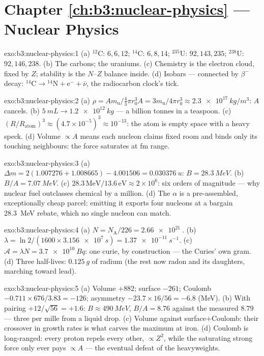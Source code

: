 \section*{Chapter \ref{ch:b3:nuclear-physics} --- Nuclear Physics}

\begin{solution}{exo:b3:nuclear-physics:1}
(a) $^{12}$C: $6, 6, 12$; $^{14}$C: $6, 8, 14$; $^{235}$U:
$92, 143, 235$; $^{238}$U: $92, 146, 238$. (b) The carbons; the
uraniums. (c) Chemistry is the electron cloud, fixed by $Z$;
stability is the $N$--$Z$ balance inside. (d) Isobars ---
connected by $\beta^-$ decay: $^{14}\text{C} \to {}^{14}\text{N}
+ \text{e}^- + \bar\nu$, the radiocarbon clock's tick.
\end{solution}

\begin{solution}{exo:b3:nuclear-physics:2}
(a) $\rho = Am_{\text{u}}/\tfrac43\pi r_0^3A =
3m_{\text{u}}/4\pi r_0^3 \approx \qty{2.3e17}{kg/m^3}$: $A$
cancels. (b) $\qty{5}{mL} \to \qty{1.2e12}{kg}$ --- a billion
tonnes in a teaspoon. (c) $(R/R_{\text{atom}})^3 \approx
(4.7\times10^{-5})^3 \approx 10^{-13}$: the atom is empty space
with a heavy speck. (d) Volume $\propto A$ means each nucleon
claims fixed room and binds only its touching neighbours: the
force saturates at \unit{fm} range.
\end{solution}

\begin{solution}{exo:b3:nuclear-physics:3}
(a) $\Delta m = 2(1.007276 + 1.008665) - 4.001506 =
\qty{0.030376}{u}$: $B = \qty{28.3}{MeV}$. (b) $B/A =
\qty{7.07}{MeV}$. (c) $28.3\,\text{MeV}/13.6\,\text{eV} \approx
2\times10^6$: six orders of magnitude --- why nuclear fuel
outclasses chemical by a million. (d) The $\alpha$ is a
pre-assembled, exceptionally cheap parcel: emitting it exports
four nucleons at a bargain \qty{28.3}{MeV} rebate, which no
single nucleon can match.
\end{solution}

\begin{solution}{exo:b3:nuclear-physics:4}
(a) $N = N_{\text{A}}/226 = \qty{2.66e21}{}$. (b) $\lambda =
\ln2/(1600\times\qty{3.156e7}{s}) = \qty{1.37e-11}{s^{-1}}$. (c)
$\mathcal A = \lambda N = \qty{3.7e10}{Bq}$: one curie, by
construction --- the Curies' own gram. (d) Three half-lives:
$\qty{0.125}{g}$ of radium (the rest now radon and its
daughters, marching toward lead).
\end{solution}

\begin{solution}{exo:b3:nuclear-physics:5}
(a) Volume $+882$; surface $-261$; Coulomb $-0.711\times676/3.83
= -126$; asymmetry $-23.7\times16/56 = -6.8$ (\unit{MeV}). (b)
With pairing $+12/\sqrt{56} = +1.6$: $B \approx \qty{490}{MeV}$,
$B/A = 8.76$ against the measured $8.79$ --- three per mille
from a liquid drop. (c) Volume against surface$+$Coulomb: their
crossover in growth rates is what carves the maximum at iron.
(d) Coulomb is long-ranged: every proton repels every other,
$\propto Z^2$, while the saturating strong force only ever pays
$\propto A$ --- the eventual defeat of the heavyweights.
\end{solution}


